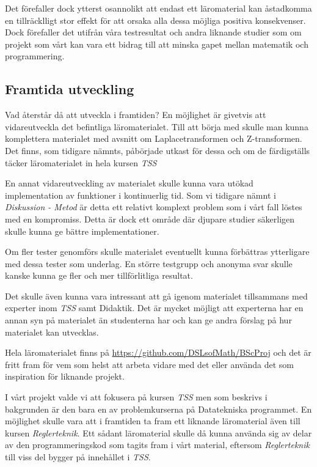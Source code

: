\documentclass[]{article}
\begin{document}
Det förefaller dock ytterst osannolikt att endast ett  läromaterial 
kan åstadkomma en tillräcklligt stor effekt för att orsaka alla
dessa möjliga positiva konsekvenser. Dock förefaller det utifrån
våra testresultat och andra liknande studier som om
projekt som vårt kan vara ett bidrag till att minska
gapet mellan matematik och programmering.

\subsection{Framtida utveckling}
Vad återstår då att utveckla i framtiden? En möjlighet är givetvis att
vidareutveckla det befintliga läromaterialet. Till att börja med
skulle man kunna komplettera materialet med avsnitt om
Laplacetransformen och Z-transformen. Det finns, som tidigare nämnts,
påbörjade utkast för dessa och om de färdigställs täcker
läromaterialet in hela kursen \textit{TSS}

En annat vidareutveckling av materialet skulle kunna vara utökad
implementation av funktioner i kontinuerlig tid. Som vi tidigare nämnt
i \textit{Diskussion - Metod} är detta ett relativt komplext problem
som i vårt fall löstes med en kompromiss. Detta är dock ett område där
djupare studier säkerligen skulle kunna ge bättre implementationer.

Om fler tester genomförs skulle materialet eventuellt kunna förbättras
ytterligare med dessa tester som underlag. En större testgrupp och
anonyma svar skulle kanske kunna ge fler och mer tillförlitliga
resultat.

Det skulle även kunna vara intressant att gå igenom materialet
tillsammans med experter inom \textit{TSS} samt Didaktik. Det är
mycket möjligt att experterna har en annan syn på materialet än
studenterna har och kan ge andra förslag på hur materialet kan
utvecklas.

Hela läromaterialet finns på \url{https://github.com/DSLsofMath/BScProj} och det är
fritt fram för vem som helst att arbeta vidare med det eller använda
det som inspiration för liknande projekt.

I vårt projekt valde vi att fokusera på kursen \textit{TSS} men som
beskrivs i bakgrunden är den bara en av problemkurserna på
Datatekniska programmet. En möjlighet skulle vara att i framtiden ta
fram ett liknande läromaterial även till kursen
\textit{Reglerteknik}. Ett sådant läromaterial skulle då kunna använda
sig av delar av den programmeringskod som tagits fram i vårt material,
eftersom \textit{Reglerteknik} till viss del bygger på innehållet i
\textit{TSS}.
\end{document}
